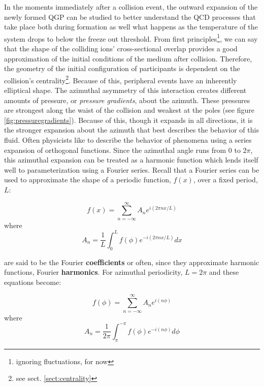 In the moments immediately after a collision event, the outward expansion of the newly formed QGP can be studied to better understand the QCD processes that take place both during formation as well what happens as the temperature of the system drops to below the freeze out threshold. From first principles\footnote{ignoring fluctuations, for now}, we can say that the shape of the colliding ions' cross-sectional overlap provides a good approximation of the initial conditions of the medium after collision. Therefore, the geometry of the initial configuration of participants is dependent on the collision's centrality\footnote{see sect. \ref{sect:centrality}}. Because of this, peripheral events have an inherently elliptical shape. The azimuthal asymmetry of this interaction creates different amounts of pressure, or \textit{pressure gradients}, about the azimuth. These pressures are strongest along the waist of the collision and weakest at the poles (see figure \ref{fig:pressuregradients}). Because of this, though it expands in all directions, it is the stronger expansion about the azimuth that best describes the behavior of this fluid. Often physicists like to describe the behavior of phenomena using a series expansion of orthogonal functions. Since the azimuthal angle runs from $0$ to $2 \pi$, this azimuthal expansion can be treated as a harmonic function which lends itself well to parameterization using a Fourier series. Recall that a Fourier series can be used to approximate the shape of a periodic function, $f(x)$, over a fixed period, $L$:

\begin{equation}
f(x) = \sum^{\infty}_{n=-\infty} A_{n} e^{i(2 \pi n x / L)}
\end{equation}
where
\begin{equation}
A_{n} = \frac{1}{L} \int^{L}_{0} f(\phi) e^{-i(2 \pi n x / L)} dx
\end{equation}

are said to be the Fourier \textbf{coefficients} or often, since they approximate harmonic functions, Fourier \textbf{harmonics}. For azimuthal periodicity, $L=2\pi$ and these equations become: 

\begin{equation}
f(\phi) = \sum^{\infty}_{n=-\infty} A_{n} e^{i(n \phi)}
\end{equation}
where
\begin{equation}
A_{n} = \frac{1}{2\pi} \int^{-\pi}_{\pi} f(\phi) e^{-i(n \phi)} d\phi
\end{equation}

